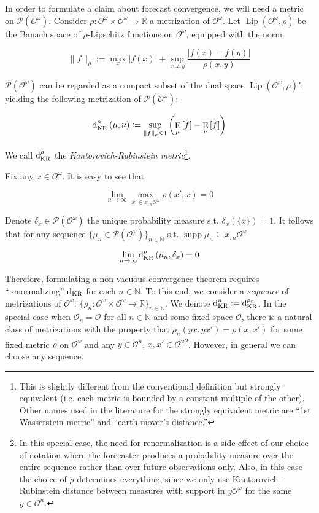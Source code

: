 \documentclass[11pt]{article}
\theoremstyle{definition}
\theoremstyle{plain}
\newcommand{\Nats}{\mathbb{N}}
\newcommand{\Reals}{\mathbb{R}}
\newcommand{\A}[1]{\lvert #1 \rvert}
\newcommand{\N}[1]{\lVert #1 \rVert}
\newcommand{\Sq}[2]{\{#1\}_{#2 \in \Nats}}
\newcommand{\Sqn}[1]{\Sq{#1}{n}}
\DeclareMathOperator{\E}{E}
\newcommand{\PM}{\mathcal{P}}
\newcommand{\Lp}{{\operatorname{Lip}}}
\DeclareMathOperator{\Sp}{supp}
\newcommand{\DKR}{\operatorname{d}_{\textnormal{KR}}}
\newcommand{\Ob}{\mathcal{O}}
\newcommand{\OO}{\Ob^\omega}
\newcommand{\PMO}{\PM(\OO)}
\begin{document}
In order to formulate a claim about forecast convergence, we will need a metric on $\PMO$. Consider $\rho: \OO \times \OO \rightarrow \Reals$ a metrization of $\OO$. Let $\Lp\left(\OO,\rho\right)$ be the Banach space of $\rho$-Lipschitz functions on $\OO$, equipped with the norm

\begin{equation}
\N{f}_\rho:=\max_{x}{\A{f\left(x\right)}} + \sup_{x \ne y} \frac{\A{f\left(x\right)-f\left(y\right)}}{\rho\left(x,y\right)}
\end{equation}

$\PMO$ can be regarded as a compact subset of the dual space $\Lp\left(\OO,\rho\right)'$, yielding the following metrization of $\PMO$:

\begin{equation}
\DKR^\rho\left(\mu,\nu\right):=\sup_{\N{f}_\rho \leq 1}{\left(\E_\mu\left[f\right] - \E_\nu\left[f\right]\right)}
\end{equation}

We call $\DKR^\rho$ the \emph{Kantorovich-Rubinstein metric}\footnote{This is slightly different from the conventional definition but strongly equivalent (i.e. each metric is bounded by a constant multiple of the other). Other names used in the literature for the strongly equivalent metric are \enquote{1st Wasserstein metric} and \enquote{earth mover's distance.}}.

Fix any $x \in \OO$. It is easy to see that

\begin{equation}
\lim_{n \rightarrow \infty} \max_{x' \in x_{:n}\OO} \rho\left(x', x\right) = 0
\end{equation}

Denote $\delta_x \in \PMO$ the unique probability measure s.t. $\delta_x\left(\{x\}\right)=1$. It follows that for any sequence $\Sqn{\mu_n \in \PMO}$ s.t. $\Sp{\mu_n} \subseteq x_{:n}\OO$

\begin{equation}
\lim_{n \rightarrow \infty} \DKR^\rho\left(\mu_n, \delta_x\right) = 0
\end{equation}

Therefore, formulating a non-vacuous convergence theorem requires \enquote{renormalizing} $\DKR$ for each $n \in \Nats$. To this end, we consider a \emph{sequence} of metrizations of $\OO$: $\Sqn{\rho_n: \OO \times \OO \rightarrow \Reals}$. We denote $\DKR^n:=\DKR^{\rho_n}$. In the special case when $\Ob_n=\Ob$ for all $n \in \Nats$ and some fixed space $\Ob$, there is a natural class of metrizations with the property that $\rho_n(yx,yx')=\rho(x,x')$ for some fixed metric $\rho$ on $\OO$ and any $y \in \Ob^n$, $x,x' \in \OO$\footnote{In this special case, the need for renormalization is a side effect of our choice of notation where the forecaster produces a probability measure over the entire sequence rather than over future observations only. Also, in this case the choice of $\rho$ determines everything, since we only use Kantorovich-Rubinstein distance between measures with support in $y\OO$ for the same $y \in \Ob^n$.}. However, in general we can choose any sequence.
\end{document}
